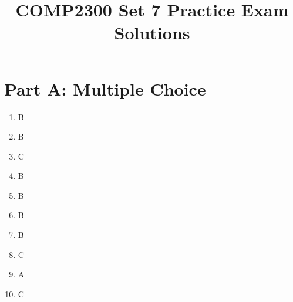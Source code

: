 \documentclass[11pt]{article}
\title{COMP2300 Set 7 Practice Exam Solutions}
\author{}
\date{}
\begin{document}
\maketitle

\section*{Part A: Multiple Choice}
\begin{enumerate}[label=\textbf{A\arabic*.}]
  \item B
  \item B
  \item C
  \item B
  \item B
  \item B
  \item B
  \item C
  \item A
  \item C
\end{enumerate}
\end{document}
